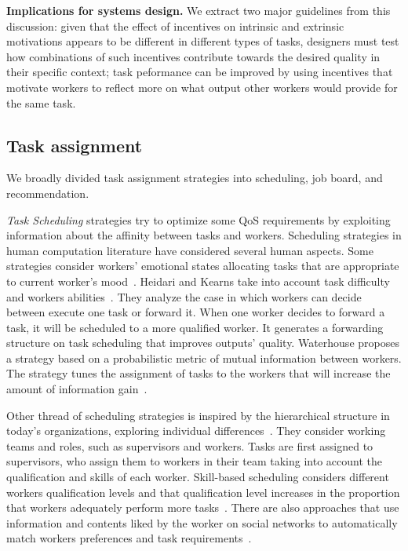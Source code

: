 \documentclass[11pt]{bmc_article_s50}
\begin{document}
\textbf{Implications for systems design.} We extract two major guidelines from this discussion:  given that the effect of incentives on intrinsic and extrinsic motivations appears to be different in different types of tasks, designers must test how combinations of such incentives contribute towards the desired quality in their specific context;  task peformance can be improved by using incentives that motivate workers to reflect more on what output other workers would provide for the same task.

\subsection{Task assignment}

We broadly divided task assignment strategies into scheduling, job board, and recommendation.

\textit{Task Scheduling} strategies try to optimize some QoS requirements by exploiting information about the affinity between tasks and workers. Scheduling strategies in human computation literature have considered several human aspects. Some strategies consider workers' emotional states allocating tasks that are appropriate to current worker's mood~\cite{Morris:2011}. {\color{black}Heidari and Kearns take into account task difficulty and workers abilities~\cite{Heidari:2013}. They  analyze the case in which workers can decide between execute one task or forward it. When one worker decides to forward a task, it will be scheduled to a more qualified worker. It generates a forwarding structure on task scheduling that improves outputs' quality. Waterhouse proposes a strategy based on a probabilistic metric of mutual information between workers. The strategy tunes the assignment of tasks to the workers that will increase the amount of information gain~\cite{Waterhouse:2013}.}

Other thread of scheduling strategies is inspired by the hierarchical structure in today's organizations, exploring individual differences~\cite{Noronha:2011,Schallwwwj:2012}. They consider working teams and roles, such as supervisors and workers. Tasks are first assigned to supervisors, who assign them to workers in their team taking into account the qualification and skills of each worker. Skill-based scheduling considers different workers qualification levels and that qualification level increases in the proportion that workers adequately perform more tasks~\cite{Satzger:2011}. There are also approaches that use information and contents liked by the worker on social networks to automatically match workers preferences and task requirements~\cite{Difallah:www:2013}.
\end{document}
